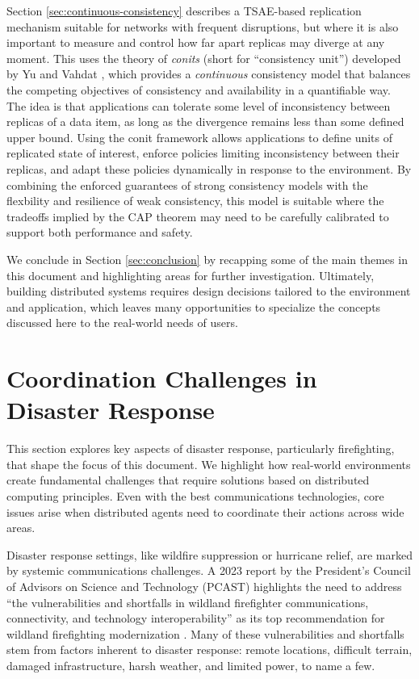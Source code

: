 \documentclass[]             %
{NASA}                       %
\theoremstyle{definition}
\begin{document}
Section \ref{sec:continuous-consistency} describes a TSAE-based
replication mechanism suitable for networks with frequent disruptions,
but where it is also important to measure and control how far apart
replicas may diverge at any moment. This uses the theory of
\emph{conits} (short for ``consistency unit'') developed by Yu and
Vahdat \cite{2002tact}, which provides a \emph{continuous} consistency
model that balances the competing objectives of consistency and
availability in a quantifiable way. The idea is that applications can
tolerate some level of inconsistency between replicas of a data item,
as long as the divergence remains less than some defined upper
bound. Using the conit framework allows applications to define units
of replicated state of interest, enforce policies limiting
inconsistency between their replicas, and adapt these policies
dynamically in response to the environment. By combining the enforced
guarantees of strong consistency models with the flexbility and
resilience of weak consistency, this model is suitable where the
tradeoffs implied by the CAP theorem may need to be carefully
calibrated to support both performance and safety.

We conclude in Section \ref{sec:conclusion} by recapping some of the
main themes in this document and highlighting areas for further
investigation. Ultimately, building distributed systems requires
design decisions tailored to the environment and application, which
leaves many opportunities to specialize the concepts discussed here to
the real-world needs of users.

\section{Coordination Challenges in Disaster Response}
\label{sec:disaster-response}
This section explores key aspects of disaster response, particularly
firefighting, that shape the focus of this document. We highlight how
real-world environments create fundamental challenges that require
solutions based on distributed computing principles. Even with the
best communications technologies, core issues arise when distributed
agents need to coordinate their actions across wide areas.

Disaster response settings, like wildfire suppression or hurricane
relief, are marked by systemic communications challenges. A 2023
report by the President’s Council of Advisors on Science and
Technology (PCAST) highlights the need to address ``the
vulnerabilities and shortfalls in wildland firefighter communications,
connectivity, and technology interoperability'' as its top
recommendation for wildland firefighting modernization
\cite{pcast2023}. Many of these vulnerabilities and shortfalls stem
from factors inherent to disaster response: remote locations,
difficult terrain, damaged infrastructure, harsh weather, and limited
power, to name a few.
\end{document}
